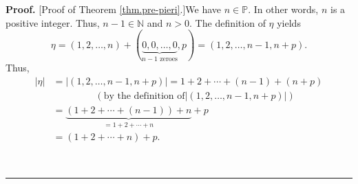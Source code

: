 \documentclass
[numbers=enddot,12pt,final,onecolumn,notitlepage,english]{scrartcl}%
\theoremstyle{definition}
\newenvironment{proof}[1][Proof]{\noindent\textbf{#1.} }{\ \rule{0.5em}{0.5em}}
\newenvironment{verlong}{}{}
\begin{document}
\begin{verlong}
\begin{proof}
[Proof of Theorem \ref{thm.pre-pieri}.]We have $n\in\mathbb{P}$. In other
words, $n$ is a positive integer. Thus, $n-1\in\mathbb{N}$ and $n>0$. The
definition of $\eta$ yields%
\[
\eta=\left(  1,2,\ldots,n\right)  +\left(  \underbrace{0,0,\ldots
,0}_{n-1\text{ zeroes}},p\right)  =\left(  1,2,\ldots,n-1,n+p\right)  .
\]
Thus,%
\begin{align}
\left\vert \eta\right\vert  &  =\left\vert \left(  1,2,\ldots,n-1,n+p\right)
\right\vert =1+2+\cdots+\left(  n-1\right)  +\left(  n+p\right) \nonumber\\
&  \ \ \ \ \ \ \ \ \ \ \ \ \ \ \ \ \ \ \ \ \left(  \text{by the definition of
}\left\vert \left(  1,2,\ldots,n-1,n+p\right)  \right\vert \right) \nonumber\\
&  =\underbrace{\left(  1+2+\cdots+\left(  n-1\right)  \right)  +n}%
_{=1+2+\cdots+n}+p\nonumber\\
&  =\left(  1+2+\cdots+n\right)  +p. \label{pf.thm.pre-pieri.sum-eta}%
\end{align}



\end{proof}
\end{verlong}
\end{document}
